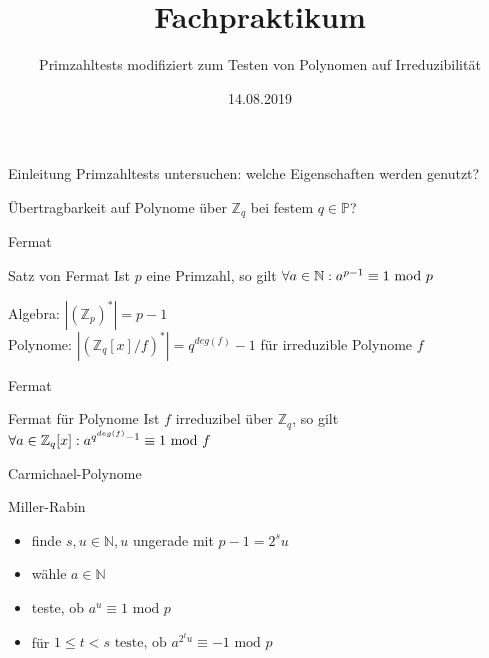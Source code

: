 \documentclass[german,10pt,xcolor=colortbl,compress]{beamer}%
\title{Fachpraktikum}
\subtitle{Primzahltests modifiziert zum Testen von Polynomen auf Irreduzibilität}
\date[]{14.08.2019} %
\newcommand{\ZZ}{\mathbb{Z}}
\newcommand{\NN}{\mathbb{N}}
\newcommand{\PP}{\mathbb{P}}
\begin{document}
	\maketitle
		
	\begin{frame}{Einleitung}	
		Primzahltests untersuchen: welche Eigenschaften werden genutzt? \\
		\medskip 
		
		Übertragbarkeit auf Polynome über $\ZZ_q$ bei festem $q \in \PP$?	
	\end{frame}
	
	
	\begin{frame}{Fermat}
		\begin{block}{Satz von Fermat}
			Ist $p$ eine Primzahl, so gilt $  \forall a \in \NN:  
			\newline	
			a^{p-1} \equiv 1 \text{ mod } p $	
		\end{block}
	
		\medskip
		Algebra: $|(\ZZ_p)^*| = p-1$ \\
		\medskip
		Polynome: $ |(\ZZ_q[x]/f)^*| = q^{deg(f)}-1 $ für irreduzible Polynome $f$	
	\end{frame}
	
	
	\begin{frame}{Fermat}
		\begin{block}{Fermat für Polynome}
			Ist $f$ irreduzibel über $\ZZ_q$, so gilt $  \forall a \in \ZZ_q[x]:
			 \newline a^{q^{deg(f)}-1}  \equiv 1 \text{ mod } f$
		\end{block}
	\end{frame}


	\begin{frame}{Carmichael-Polynome}
			
	
	
	\end{frame}


	\begin{frame}{Miller-Rabin}
		\begin{itemize}
			\item finde $s,u \in \NN,u $ ungerade mit $p-1=2^su $
			\item wähle $a \in \NN$ 
			\item teste, ob $a^u \equiv 1 \text{ mod } p$
			\item für $1\leq t < s \text{ teste, ob } a^{2^t u} \equiv -1 \text{ mod } p$
		\end{itemize}
	\end{frame}
\end{document}
